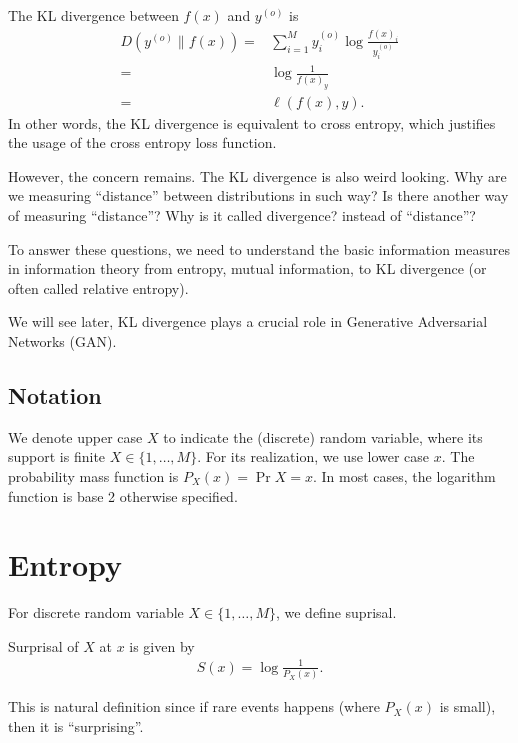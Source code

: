 \documentclass{article}
\begin{document}
The KL divergence between $f(x)$ and $y^{(o)}$ is
\begin{align}
    D(y^{(o)}\| f(x)) 
    =&  \sum_{i=1}^M y^{(o)}_i \log \frac{f(x)_i}{y^{(o)}_i}\\
    =& \log \frac{1}{f(x)_y}\\ 
    =& \ell(f(x),y).
\end{align}
In other words, the KL divergence is equivalent to cross entropy,
which justifies the usage of the cross entropy loss function.

However, the concern remains.
The KL divergence is also weird looking.
Why are we measuring ``distance'' between distributions in such way?
Is there another way of measuring ``distance''?
Why is it called divergence? instead of ``distance''?

To answer these questions, we need to understand the basic information measures in information theory
from entropy, mutual information, to KL divergence (or often called relative entropy).


\begin{remark}
    We will see later, KL divergence plays a crucial role in Generative Adversarial Networks (GAN).
\end{remark}

\subsection{Notation} \label{subsec:notation}
We denote upper case $X$ to indicate the (discrete) random variable,
where its support is finite $X\in\{1, \dots, M\}$.
For its realization, we use lower case $x$.
The probability mass function is $P_X(x) = \Pr{X= x}$.
In most cases, the logarithm function is base 2 otherwise specified.

\section{Entropy} \label{sec:entropy}
For discrete random variable $X\in\{1, \dots, M\}$,
we define suprisal.
\begin{definition}
    Surprisal of $X$ at $x$ is given by
    \begin{align}
        S(x) = \log \frac{1}{P_X(x)}.
    \end{align}
\end{definition}
This is natural definition since if rare events happens (where $P_X(x)$ is small), then it is ``surprising''.
\end{document}
